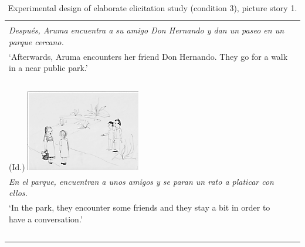 \documentclass[output=paper]{langsci/langscibook}
\begin{document}
\begin{table}
\begin{tabularx}{\textwidth}{p{5cm}p{6cm}}
\begin{minipage}[t]{5cm}
\end{minipage}& \begin{minipage}[t]{6cm}
\ \\
\textit{Después, Aruma encuentra a su amigo Don Hernando y dan un paseo en un parque cercano.}\\
{‘Afterwards, Aruma encounters her friend Don Hernando. They go for a walk in a near public park.’}
\end{minipage}\\
\ \\
\begin{minipage}[t]{5cm}(Id.)
\includegraphics[width=5cm]{figures/UTH-img10.png}
\end{minipage}& \begin{minipage}[t]{6cm}
\ \\
\textit{En el parque, encuentran a unos amigos y se paran un rato a platicar con ellos.}\\
{‘In the park, they encounter some friends and they stay a bit in order to have a conversation.’}
\end{minipage}\\
\ \\
\end{tabularx}
 \caption{\label{tab:uth:1} Experimental design of elaborate elicitation study (condition 3), picture story 1.}
\end{table}
\end{document}
